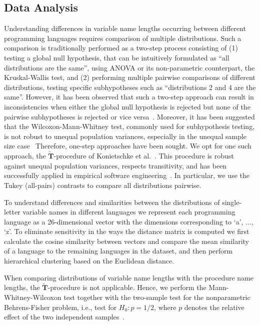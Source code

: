 \documentclass[conference]{IEEEtran}
\begin{document}
\subsection{Data Analysis}
\label{sec:da}
Understanding differences in variable name lengths occurring between different programming languages requires comparison of multiple distributions. 
Such a comparison is traditionally performed as a two-step process consisting of (1) testing a global null hypothesis, that can be intuitively formulated as ``all distributions are the same'', using ANOVA or its non-parametric counterpart, the Kruskal-Wallis test, and (2) performing multiple pairwise comparisons of different distributions, testing specific subhypotheses such as ``distributions 2 and 4 are the same''. 
However, it has been observed that such a two-step approach can result in inconsistencies when either the global null hypothesis is rejected but none of the pairwise subhypotheses is rejected or vice versa~\cite{Gabriel}. 
Moreover, it has been suggested that the Wilcoxon-Mann-Whitney test, commonly used for subhypothesis testing, is not robust to unequal population variances, especially in the unequal sample size case~\cite{Zimmerman:Zumbo}
Therefore, one-step approaches have been sought.
We opt for one such approach, the $\widetilde{\mathbf{T}}$-procedure of Konietschke et al.~\cite{Konietschke:Hothorn:Brunner,Konietschke:nparcomp}. 
This procedure is robust against unequal population variances, respects transitivity, and has been successfully applied in empirical software engineering~\cite{VasilescuSGM14,VasilescuCS14,YuWYW16}.
In particular, we use the Tukey (all-pairs) contrasts to compare all distributions pairwise.

To understand differences and similarities between the distributions of single-letter variable names in different languages we represent each programming language as a 26-dimensional vector with the dimensions corresponding to `a', ..., `z'.
To eliminate sensitivity in the ways the distance matrix is computed we first calculate the cosine similarity between vectors and compare the mean similarity of a language to the remaining languages in the dataset, and then perform hierarchical clustering based on the Euclidean distance.

When comparing distributions of variable name lengths with the procedure name lengths, the $\widetilde{\mathbf{T}}$-procedure is not applicable.
Hence, we perform the Mann-Whitney-Wilcoxon test together with the two-sample test for the nonparametric Behrens-Fisher problem, i.e., test for
$H_0: p = 1/2$, where $p$ denotes the relative effect of the two independent samples~\cite{Neubert,Konietschke:nparcomp}.
\end{document}
